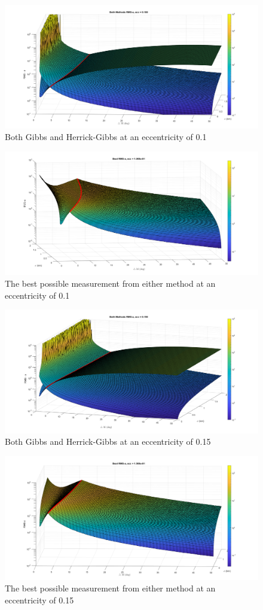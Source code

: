 \documentclass[12pt]{article}
\begin{document}
	\begin{figure}
	\centering
	\includegraphics[width=0.7\linewidth]{bothMethods_e_1}
	\caption{Both Gibbs and Herrick-Gibbs at an eccentricity of 0.1}
	\label{fig:bothmethodse1}
\end{figure}
\begin{figure}
	\centering
	\includegraphics[width=0.7\linewidth]{bestMethods_e_1}
	\caption{The best possible measurement from either method at an eccentricity of 0.1}
	\label{fig:bestmethodse1}
\end{figure}
	\begin{figure}
	\centering
	\includegraphics[width=0.7\linewidth]{bothMethods_e_15}
	\caption{Both Gibbs and Herrick-Gibbs at an eccentricity of 0.15}
	\label{fig:bothmethodse15}
\end{figure}
\begin{figure}
	\centering
	\includegraphics[width=0.7\linewidth]{bestMethods_e_15}
	\caption{The best possible measurement from either method at an eccentricity of 0.15}
	\label{fig:bestmethodse15}
\end{figure}
\end{document}
